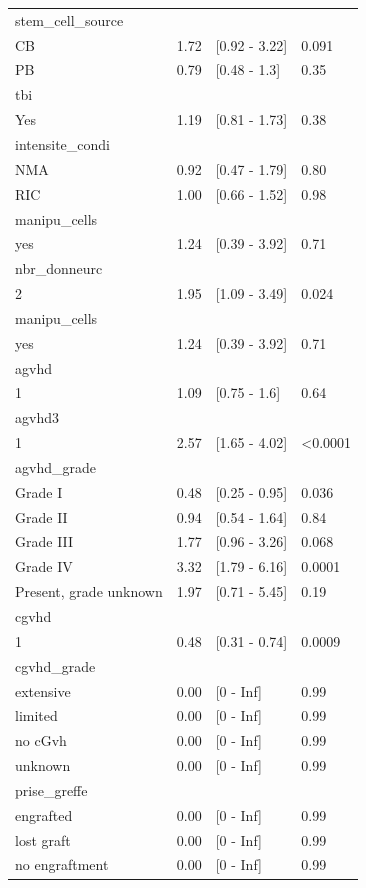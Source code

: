 \documentclass[a4paper,11pt] {article}
\begin{document}
\begin{longtable}{lrll}
  stem_cell_source &  &  &  \\ 
  CB & 1.72 & [0.92 - 3.22] & 0.091 \\ 
  PB & 0.79 & [0.48 - 1.3] & 0.35 \\ 
  tbi &  &  &  \\ 
  Yes & 1.19 & [0.81 - 1.73] & 0.38 \\ 
  intensite_condi &  &  &  \\ 
  NMA & 0.92 & [0.47 - 1.79] & 0.80 \\ 
  RIC & 1.00 & [0.66 - 1.52] & 0.98 \\ 
  manipu_cells &  &  &  \\ 
  yes & 1.24 & [0.39 - 3.92] & 0.71 \\ 
  nbr_donneurc &  &  &  \\ 
  2 & 1.95 & [1.09 - 3.49] & 0.024 \\ 
  manipu_cells &  &  &  \\ 
  yes & 1.24 & [0.39 - 3.92] & 0.71 \\ 
  agvhd &  &  &  \\ 
  1 & 1.09 & [0.75 - 1.6] & 0.64 \\ 
  agvhd3 &  &  &  \\ 
  1 & 2.57 & [1.65 - 4.02] & <0.0001 \\ 
  agvhd_grade &  &  &  \\ 
  Grade I & 0.48 & [0.25 - 0.95] & 0.036 \\ 
  Grade II & 0.94 & [0.54 - 1.64] & 0.84 \\ 
  Grade III & 1.77 & [0.96 - 3.26] & 0.068 \\ 
  Grade IV & 3.32 & [1.79 - 6.16] & 0.0001 \\ 
  Present, grade unknown & 1.97 & [0.71 - 5.45] & 0.19 \\ 
  cgvhd &  &  &  \\ 
  1 & 0.48 & [0.31 - 0.74] & 0.0009 \\ 
  cgvhd_grade &  &  &  \\ 
  extensive & 0.00 & [0 - Inf] & 0.99 \\ 
  limited & 0.00 & [0 - Inf] & 0.99 \\ 
  no cGvh & 0.00 & [0 - Inf] & 0.99 \\ 
  unknown & 0.00 & [0 - Inf] & 0.99 \\ 
  prise_greffe &  &  &  \\ 
  engrafted & 0.00 & [0 - Inf] & 0.99 \\ 
  lost graft & 0.00 & [0 - Inf] & 0.99 \\ 
  no engraftment & 0.00 & [0 - Inf] & 0.99 \\ 

\end{longtable}
\end{document}
